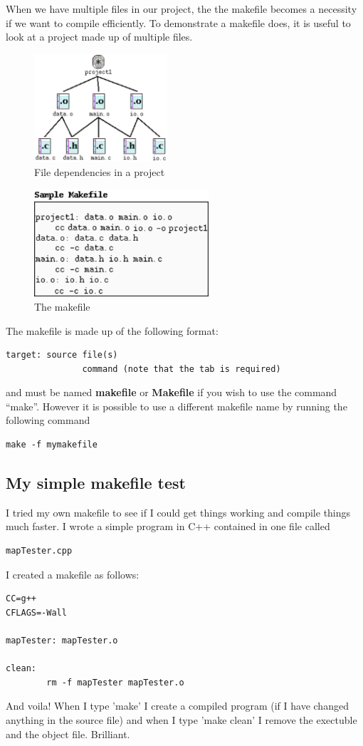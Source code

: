 When we have multiple files in our project, the the makefile becomes a necessity if we want to compile efficiently. To demonstrate a makefile does, it is useful to look at a project made up of multiple files.
\begin{figure}[htbp]
\begin{center}
\includegraphics[height=4cm]{figures/depgraph.eps}
\caption{File dependencies in a project}
\label{default}
\end{center}
\end{figure}
\begin{figure}[htbp]
\begin{center}
\includegraphics[height=4cm]{figures/makefile.eps}
\caption{The makefile}
\label{default}
\end{center}
\end{figure}
The makefile is made up of the following format:
\begin{verbatim}
target: source file(s)
		       command (note that the tab is required)
\end{verbatim}
and must be named {\bf makefile} or {\bf Makefile} if you wish to use the command ``make''. However it is possible to use a different makefile name by running the following command
\begin{verbatim}
make -f mymakefile
\end{verbatim}

\subsection{My simple makefile test}

I tried my own makefile to see if I could get things working and compile things much faster. I wrote a simple program in C++ contained in one file called 
\begin{verbatim}
mapTester.cpp
\end{verbatim}
I created a makefile as follows:
\begin{verbatim}
CC=g++
CFLAGS=-Wall

mapTester: mapTester.o

clean:
        rm -f mapTester mapTester.o
\end{verbatim}
And voila! When I type 'make' I create a compiled program (if I have changed anything in the source file) and when I type 'make clean' I remove the exectuble and the object file. Brilliant.


